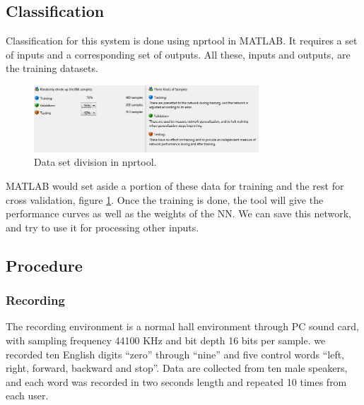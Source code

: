 \documentclass[12pt, a4paper, twoside]{report}
\begin{document}
\subsection{Classification}
Classification for this system is done using nprtool in MATLAB. It requires a set of inputs and a corresponding set of outputs. All these, inputs and outputs, are the training datasets.
\begin{figure}[!ht]
	\centering
	\includegraphics[width=0.75\textwidth]
	{images/chapter5/dtw-nprtool}
	\caption{Data set division in nprtool.}
	\label{fig:dtw-nprtool}
\end{figure}

MATLAB would set aside a portion of these data for training and the rest for cross validation, figure \ref{fig:dtw-nprtool}. Once the training is done, the tool will give the performance curves as well as the weights of the NN. We can save this network, and try to use it for processing other inputs.

\subsection{Procedure}
\subsubsection{Recording}
The recording environment is a normal hall environment through PC sound card, with sampling frequency 44100 KHz and bit depth 16 bits per sample. we recorded ten English digits “zero” through “nine” and five control words “left, right, forward, backward and stop”. Data are collected from ten male speakers, and each word was recorded in two seconds length and repeated 10 times from each user.
\end{document}
